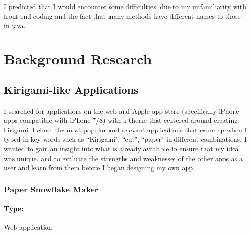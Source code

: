 \documentclass[11pt]{article}
\begin{document}
                    I predicted that I would encounter some difficulties, due to my unfamiliarity with front-end coding and the fact that many methods have different names to those in java.
                
               
               

\newpage
\section{Background Research}

        \subsection{Kirigami-like Applications}
           \paragraph{}
            I searched for applications on the web and Apple app store (specifically iPhone apps compatible with iPhone 7/8) with a theme that centered around creating kirigami. I chose the most popular and relevant applications that came up when I typed in key words such as ``Kirigami", ``cut", ``paper" in different combinations. I wanted to gain an insight into what is already available to ensure that my idea was unique, and to evaluate the strengths and weaknesses of the other apps as a user and learn from them before I began designing my own app.
            
            \subsubsection{Paper Snowflake Maker}
            
                \paragraph{Type:} Web application \cite{PaperSnowflakeMaker}
\end{document}
